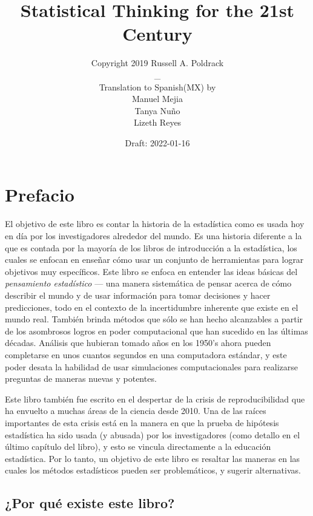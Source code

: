 \documentclass[
  12pt,
]{book}
\title{Statistical Thinking for the 21st Century}
\author{Copyright 2019 Russell A. Poldrack\\
\_\\
Translation to Spanish(MX) by\\
Manuel Mejia\\
Tanya Nuño\\
Lizeth Reyes}
\date{Draft: 2022-01-16}
\begin{document}
\maketitle

{
\hypersetup{linkcolor=}
\setcounter{tocdepth}{1}
\tableofcontents
}
\hypertarget{prefacio}{%
\chapter*{Prefacio}\label{prefacio}}

El objetivo de este libro es contar la historia de la estadística como es usada hoy en día por los investigadores alrededor del mundo. Es una historia diferente a la que es contada por la mayoría de los libros de introducción a la estadística, los cuales se enfocan en enseñar cómo usar un conjunto de herramientas para lograr objetivos muy específicos. Este libro se enfoca en entender las ideas básicas del \emph{pensamiento estadístico} --- una manera sistemática de pensar acerca de cómo describir el mundo y de usar información para tomar decisiones y hacer predicciones, todo en el contexto de la incertidumbre inherente que existe en el mundo real. También brinda métodos que sólo se han hecho alcanzables a partir de los asombrosos logros en poder computacional que han sucedido en las últimas décadas. Análisis que hubieran tomado años en los 1950's ahora pueden completarse en unos cuantos segundos en una computadora estándar, y este poder desata la habilidad de usar simulaciones computacionales para realizarse preguntas de maneras nuevas y potentes.

Este libro también fue escrito en el despertar de la crisis de reproducibilidad que ha envuelto a muchas áreas de la ciencia desde 2010. Una de las raíces importantes de esta crisis está en la manera en que la prueba de hipótesis estadística ha sido usada (y abusada) por los investigadores (como detallo en el último capítulo del libro), y esto se vincula directamente a la educación estadística. Por lo tanto, un objetivo de este libro es resaltar las maneras en las cuales los métodos estadísticos pueden ser problemáticos, y sugerir alternativas.

\hypertarget{por-quuxe9-existe-este-libro}{%
\section{¿Por qué existe este libro?}\label{por-quuxe9-existe-este-libro}}
\end{document}
